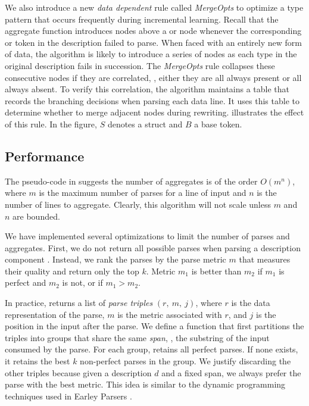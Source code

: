 We also introduce a new {\em data dependent} rule called {\em MergeOpts}
to optimize a type pattern that occurs frequently during incremental
learning.  Recall that the aggregate function
introduces  nodes above a  or  node 
whenever the corresponding  or  token in 
the description failed to 
parse. When faced with an entirely new form of data, 
the algorithm is likely to introduce a series of  nodes as
each type in the original description fails in succession. 
The {\em MergeOpts} rule collapses these consecutive  nodes if they
are correlated, \ie{}, either they are all always present or all always
absent.  To verify this correlation, the algorithm maintains a
table that records the branching decisions when parsing each
data line. It uses this table to determine whether to merge
adjacent  nodes during rewriting. 
 illustrates the effect of this rule.  In the figure,
$S$ denotes a struct and $B$ a base token.

\subsection{Performance}
The pseudo-code in  suggests the number of
aggregates is of the order $O(m ^ n)$, where $m$ is the maximum number of
parses for a line of input  and $n$ is the number of lines to
aggregate.  Clearly, this algorithm will not scale 
unless $m$ and $n$ are bounded.

We have implemented several optimizations to limit the number of 
parses and aggregates. First, we do not return all possible
parses when parsing a description component . 
Instead, we rank the parses by the parse metric $m$ that
measures their quality and return only the top $k$. 
Metric $m_1$ is better than $m_2$ if $m_1$ is perfect and $m_2$ is not, 
or if $m_1 > m_2$.

In practice,  returns a list of
{\em parse triples} $(r,~m,~j)$, where $r$ is the data representation of
the parse, $m$ is the metric associated with $r$, and
$j$ is the position in the input after the parse.
We define a  function that first partitions the
triples into groups that share the same 
{\em span}, \ie{}, the substring of the input consumed by the parse.
For each group,  retains all perfect parses. If 
none exists, it retains the best $k$ non-perfect parses in the group. 
We justify discarding the other triples because
given a description $d$ and a fixed span, we always
prefer the parse with the best metric. This idea is
similar to the dynamic programming techniques used in 
Earley Parsers \cite{earley-parser}. 


